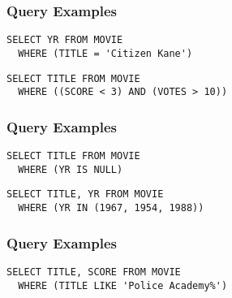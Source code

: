 \documentclass[dvipsnames]{beamer}
\theoremstyle{plain}
\begin{document}
\begin{frame}[fragile]
  \frametitle{Query Examples}

  \begin{example}
    \begin{lstlisting}
SELECT YR FROM MOVIE
  WHERE (TITLE = 'Citizen Kane')
    \end{lstlisting}
  \end{example}

  \pause
  \begin{example}
    \begin{lstlisting}
SELECT TITLE FROM MOVIE
  WHERE ((SCORE < 3) AND (VOTES > 10))
    \end{lstlisting}
  \end{example}
\end{frame}

\begin{frame}[fragile]
  \frametitle{Query Examples}

  \begin{example}
    \begin{lstlisting}
SELECT TITLE FROM MOVIE
  WHERE (YR IS NULL)
    \end{lstlisting}
  \end{example}

  \pause
  \begin{example}
    \begin{lstlisting}
SELECT TITLE, YR FROM MOVIE
  WHERE (YR IN (1967, 1954, 1988))
    \end{lstlisting}
  \end{example}
\end{frame}

\begin{frame}[fragile]
  \frametitle{Query Examples}

  \begin{example}
    \begin{lstlisting}
SELECT TITLE, SCORE FROM MOVIE
  WHERE (TITLE LIKE 'Police Academy%')
    \end{lstlisting}
  \end{example}
\end{frame}
\end{document}
